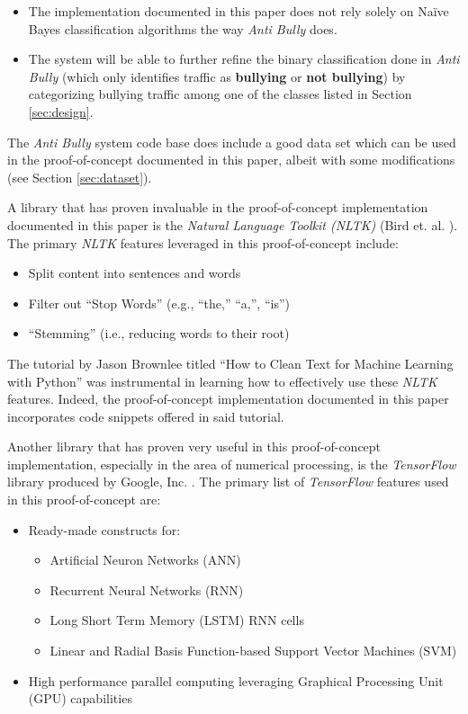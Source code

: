 \documentclass[conference]{sig-alternate-05-2015}
\begin{document}
\begin{itemize}
  \item The implementation documented in this paper does not rely solely on
  Na\"{i}ve Bayes classification algorithms the way \textit{Anti Bully} does.
  \item The system will be able to further refine the binary
  classification done in \textit{Anti Bully} (which only identifies traffic as
  \textbf{bullying} or \textbf{not bullying}) by categorizing bullying traffic
  among one of the classes listed in Section \ref{sec:design}.
\end{itemize}

The \textit{Anti Bully} system code base does include a good data set which can
be used in the proof-of-concept documented in this paper, albeit with some
modifications (see Section \ref{sec:dataset}).

A library that has proven invaluable in the proof-of-concept implementation
documented in this paper is the \textit{Natural Language Toolkit (NLTK)}
(Bird et. al. \cite{bird2009natural}). The primary \textit{NLTK} features
leveraged in this proof-of-concept include:
\begin{itemize}
  \item Split content into sentences and words
  \item Filter out ``Stop Words'' (e.g., ``the,'' ``a,'', ``is'')
  \item ``Stemming'' (i.e., reducing words to their root)
\end{itemize}

The tutorial by Jason Brownlee titled ``How to Clean Text for Machine Learning
with Python'' \cite{brownlee-2017} was instrumental in learning how to
effectively use these \textit{NLTK} features. Indeed, the proof-of-concept
implementation documented in this paper incorporates code snippets offered in
said tutorial.

Another library that has proven very useful in this proof-of-concept
implementation, especially in the area of numerical processing, is the
\textit{TensorFlow} library produced by Google, Inc.
\cite{tensorflow2015-whitepaper}. The primary list of \textit{TensorFlow}
features used in this proof-of-concept are:
\begin{itemize}
  \item Ready-made constructs for:
  \begin{itemize}
    \item Artificial Neuron Networks (ANN)
    \item Recurrent Neural Networks (RNN)
    \item Long Short Term Memory (LSTM) RNN cells
    \item Linear and Radial Basis Function-based Support Vector Machines (SVM)
  \end{itemize}
  \item High performance parallel computing leveraging Graphical Processing
  Unit (GPU) capabilities
\end{itemize}
\end{document}
